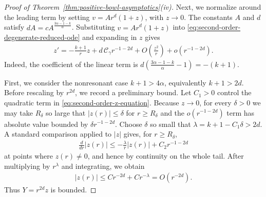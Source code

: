 \documentclass{amsart}
\theoremstyle{plain}
\theoremstyle{mainintrothm}
\theoremstyle{definition}
\begin{document}
\begin{proof}[Proof of Theorem~\ref{thm:positive-bowl-asymptotics}\textup{(iv)}]
		\medskip
		
		Next, we normalize around the leading term by setting
		$v=Ar^d(1+z)$, with $z\to0$.  The constants $A$ and $d$ satisfy
		$dA=cA^{\frac{3\alpha-1-k}{\alpha}}$.  Substituting
		$v=Ar^d(1+z)$ into \eqref{eq:second-order-degenerate-reduced-ode} and
		expanding in $z$ gives
		\begin{align}
			\label{eq:second-order-z-equation}
			z'
			=
			-\frac{k+1}{r}z
			+
			d\,\mathcal C_\gamma r^{-1-2d}
			+
			O\!\left(\frac{z^2}{r}\right)
			+
			o(r^{-1-2d}).
		\end{align}
		Indeed, the coefficient of the linear term is
		$d\left(\frac{3\alpha-1-k}{\alpha}-1\right)=-(k+1)$.
		
		\medskip
		
		First, we consider the nonresonant case $k+1>4\alpha$, equivalently
		$k+1>2d$.  Before rescaling by $r^{2d}$, we record a preliminary bound.  Let $C_1>0$ control the
		quadratic term in \eqref{eq:second-order-z-equation}.  Because $z\to0$, for
		every $\delta>0$ we may take $R_\delta$ so large that $|z(r)|\le\delta$ for
		$r\ge R_\delta$ and the $o(r^{-1-2d})$ term has absolute value bounded by
		$\delta r^{-1-2d}$.  Choose $\delta$ so small that
		$\lambda=k+1-C_1\delta>2d$.  A standard comparison applied to $|z|$ gives,
		for $r\ge R_\delta$,
		\begin{align*}
			\frac{d}{dr}|z(r)|
			\le
			-\frac{\lambda}{r}|z(r)|
			+
			C_2 r^{-1-2d}
		\end{align*}
		at points where $z(r)\ne0$, and hence by continuity on the whole tail.  After
		multiplying by $r^\lambda$ and integrating, we obtain
		\begin{align*}
			|z(r)|
			\le
			C r^{-2d}
			+
			C r^{-\lambda}
			=
			O(r^{-2d}).
		\end{align*}
		Thus $Y=r^{2d}z$ is bounded.
		
		\medskip
		

\end{proof}
\end{document}
